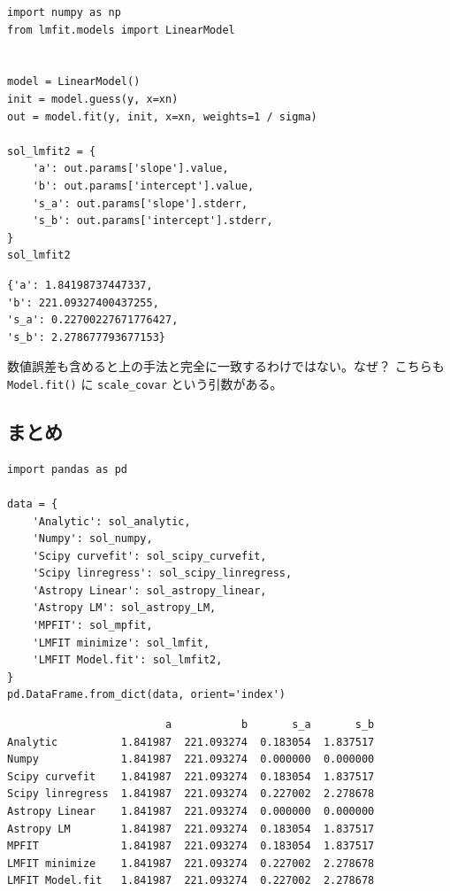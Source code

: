 \documentclass[a4paper, 8pt, notitlepage, uplatex, dvipdfmx]{jsarticle}
\begin{document}
\begin{verbatim}
import numpy as np
from lmfit.models import LinearModel


model = LinearModel()
init = model.guess(y, x=xn)
out = model.fit(y, init, x=xn, weights=1 / sigma)

sol_lmfit2 = {
    'a': out.params['slope'].value,
    'b': out.params['intercept'].value,
    's_a': out.params['slope'].stderr,
    's_b': out.params['intercept'].stderr,
}
sol_lmfit2
\end{verbatim}

\label{}
\begin{verbatim}
{'a': 1.84198737447337,
'b': 221.09327400437255,
's_a': 0.22700227671776427,
's_b': 2.278677793677153}
\end{verbatim}

数値誤差も含めると上の手法と完全に一致するわけではない。なぜ？
こちらも \texttt{Model.fit()} に \texttt{scale\_covar} という引数がある。
\subsection{まとめ}
\label{sec:org5c88113}
\begin{verbatim}
import pandas as pd

data = {
    'Analytic': sol_analytic,
    'Numpy': sol_numpy,
    'Scipy curvefit': sol_scipy_curvefit,
    'Scipy linregress': sol_scipy_linregress,
    'Astropy Linear': sol_astropy_linear,
    'Astropy LM': sol_astropy_LM,
    'MPFIT': sol_mpfit,
    'LMFIT minimize': sol_lmfit,
    'LMFIT Model.fit': sol_lmfit2,
}
pd.DataFrame.from_dict(data, orient='index')
\end{verbatim}

\label{}
\begin{verbatim}
                         a           b       s_a       s_b
Analytic          1.841987  221.093274  0.183054  1.837517
Numpy             1.841987  221.093274  0.000000  0.000000
Scipy curvefit    1.841987  221.093274  0.183054  1.837517
Scipy linregress  1.841987  221.093274  0.227002  2.278678
Astropy Linear    1.841987  221.093274  0.000000  0.000000
Astropy LM        1.841987  221.093274  0.183054  1.837517
MPFIT             1.841987  221.093274  0.183054  1.837517
LMFIT minimize    1.841987  221.093274  0.227002  2.278678
LMFIT Model.fit   1.841987  221.093274  0.227002  2.278678
\end{verbatim}
\end{document}
